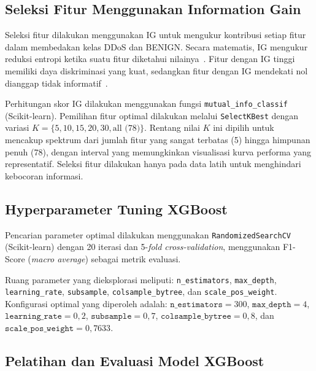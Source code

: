 \documentclass[conference,a4paper]{IEEEtran}
\begin{document}
\subsection{Seleksi Fitur Menggunakan Information Gain}

Seleksi fitur dilakukan menggunakan IG untuk mengukur kontribusi setiap fitur dalam membedakan kelas DDoS dan BENIGN. Secara matematis, IG mengukur reduksi entropi ketika suatu fitur diketahui nilainya~\cite{ref_shannon1948}. Fitur dengan IG tinggi memiliki daya diskriminasi yang kuat, sedangkan fitur dengan IG mendekati nol dianggap tidak informatif~\cite{ref_guyon2003}.

Perhitungan skor IG dilakukan menggunakan fungsi \texttt{mutual\_info\_classif} (Scikit-learn). Pemilihan fitur optimal dilakukan melalui \texttt{SelectKBest} dengan variasi $K = \{5, 10, 15, 20, 30, \text{all (78)}\}$. Rentang nilai $K$ ini dipilih untuk mencakup spektrum dari jumlah fitur yang sangat terbatas (5) hingga himpunan penuh (78), dengan interval yang memungkinkan visualisasi kurva performa yang representatif. Seleksi fitur dilakukan hanya pada data latih untuk menghindari kebocoran informasi.

\subsection{Hyperparameter Tuning XGBoost}

Pencarian parameter optimal dilakukan menggunakan \texttt{RandomizedSearchCV} (Scikit-learn) dengan 20 iterasi dan 5-\textit{fold cross-validation}, menggunakan F1-Score (\textit{macro average}) sebagai metrik evaluasi.

Ruang parameter yang dieksplorasi meliputi: \texttt{n\_estimators}, \texttt{max\_depth}, \texttt{learning\_rate}, \texttt{subsample}, \texttt{colsample\_bytree}, dan \texttt{scale\_pos\_weight}. Konfigurasi optimal yang diperoleh adalah: $\texttt{n\_estimators} = 300$, $\texttt{max\_depth} = 4$, $\texttt{learning\_rate} = 0{,}2$, $\texttt{subsample} = 0{,}7$, $\texttt{colsample\_bytree} = 0{,}8$, dan $\texttt{scale\_pos\_weight} = 0{,}7633$.

\subsection{Pelatihan dan Evaluasi Model XGBoost}
\end{document}
